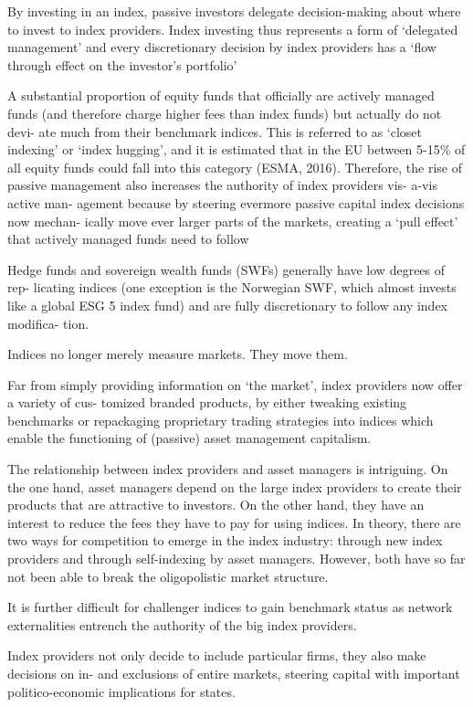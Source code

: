 \documentclass[
]{book}
\begin{document}
By investing in an index, passive investors delegate decision-making about
where to invest to index providers. Index investing thus represents a form of
`delegated management' and every discretionary decision by index providers has a
`flow through effect on the investor's portfolio'

A substantial proportion of equity funds that officially are actively managed
funds (and therefore charge higher fees than index funds) but actually do not devi-
ate much from their benchmark indices. This is referred to as `closet indexing' or
`index hugging', and it is estimated that in the EU between 5-15\% of all equity
funds could fall into this category (ESMA, 2016). Therefore, the rise of passive
management also increases the authority of index providers vis- a-vis active man-
agement because by steering evermore passive capital index decisions now mechan-
ically move ever larger parts of the markets, creating a `pull effect' that actively
managed funds need to follow

Hedge funds and sovereign wealth funds (SWFs) generally have low degrees of rep-
licating indices (one exception is the Norwegian SWF, which almost invests like a
global ESG 5 index fund) and are fully discretionary to follow any index modifica-
tion.

Indices no longer merely measure markets. They move them.

Far from simply
providing information on `the market', index providers now offer a variety of cus-
tomized branded products, by either tweaking existing benchmarks or repackaging
proprietary trading strategies into indices which enable the functioning of (passive)
asset management capitalism.

The relationship between index providers and asset managers is intriguing. On
the one hand, asset managers depend on the large index providers to create their
products that are attractive to investors. On the other hand, they have an interest
to reduce the fees they have to pay for using indices. In theory, there are two ways
for competition to emerge in the index industry: through new index providers and
through self-indexing by asset managers. However, both have so far not been able
to break the oligopolistic market structure.

It is further difficult for challenger indices to gain benchmark status as network
externalities entrench the authority of the big index providers.

Index providers not only decide to include particular firms, they
also make decisions on in- and exclusions of entire markets, steering capital with
important politico-economic implications for states.
\end{document}
